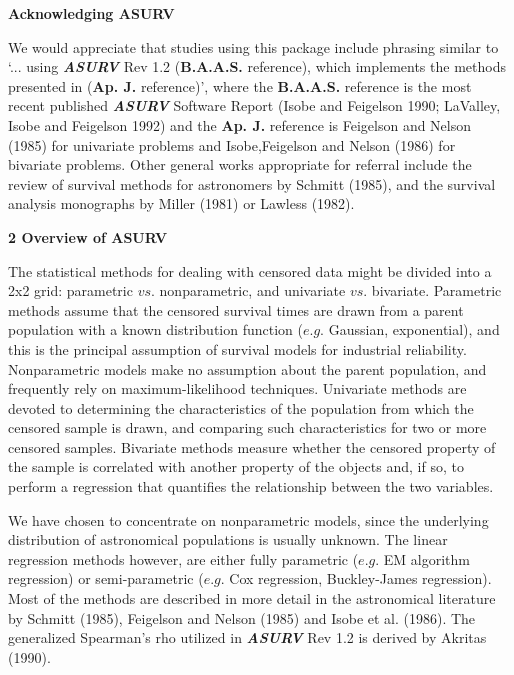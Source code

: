 \bigskip
\bigskip
\centerline{\Large\bf Acknowledging ASURV}

     We would appreciate that studies using this package include phrasing
similar to `... using {\sl\bf ASURV} Rev 1.2 ({\bf B.A.A.S.} reference),
which implements the methods presented in ({\bf Ap. J.} reference)', where
the {\bf B.A.A.S.} reference is the most recent published {\sl\bf ASURV}
Software Report (Isobe and Feigelson 1990; LaValley, Isobe and Feigelson 
1992) and the {\bf Ap. J.} reference is Feigelson and Nelson (1985) for
univariate problems and Isobe,Feigelson and Nelson (1986) for bivariate
problems.  Other general works appropriate for referral include the review
of survival methods for astronomers by Schmitt (1985), and the survival 
analysis monographs by Miller (1981) or Lawless (1982).

\newpage
\centerline{\Large\bf 2 Overview of ASURV}
    
       
\medskip
{}

     The statistical methods for dealing with censored data might be
divided into a 2x2 grid: parametric $vs.$ nonparametric, and univariate $vs.$
bivariate.  Parametric methods assume that the censored survival times
are drawn from a parent population with a known distribution function ($e.g.$
Gaussian, exponential), and this is the principal assumption of survival
models for industrial reliability.  Nonparametric models make 
no assumption about the 
parent population, and frequently rely on maximum-likelihood techniques. 
Univariate methods are devoted to determining the characteristics of the
population from which the censored sample is drawn, and comparing such 
characteristics for two or more censored samples.  Bivariate methods
measure whether the censored property of the sample is correlated with 
another property of the objects and, if so, to perform a regression  that 
quantifies the relationship between the two variables.
 
     We have chosen to concentrate on nonparametric models, since  the 
underlying distribution of astronomical populations is usually unknown. 
The linear regression methods however, are either fully parametric 
($e.g.$ EM algorithm regression) or semi-parametric
($e.g.$ Cox regression, Buckley-James regression). 
Most of the methods are described in more detail in the astronomical 
literature by Schmitt (1985), Feigelson and Nelson (1985) and Isobe et al. 
(1986).  The generalized Spearman's rho utilized in {\sl\bf ASURV} 
Rev 1.2 is derived by Akritas (1990).

